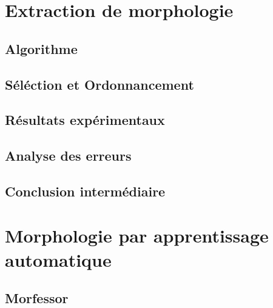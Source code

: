 \documentclass[12pt,a4paper,times,twoside,openright]{report}
\begin{document}
    \section{Extraction de morphologie}
    \label{sec:morphology-extraction}
    

        \subsection{Algorithme}
        \label{subsec:morphology-extraction-algorithm}
        
        
        \subsection{Séléction et Ordonnancement}
        \label{subsec:morphology-tree-ordering}
        
        
        \subsection{Résultats expérimentaux}
        \label{subsec:morphology-mined-affixes-results}
        

        \subsection{Analyse des erreurs}
        \label{subsec:morphology-error-analysis}
        

        \subsection{Conclusion intermédiaire}
        \label{subsec:morphology-conclusion}
        
    
    \section{Morphologie par apprentissage automatique}
    \label{sec:ML-morphology}
    
        
        \subsection{Morfessor}
        \label{subsec:morfessor}
        
        
\end{document}
